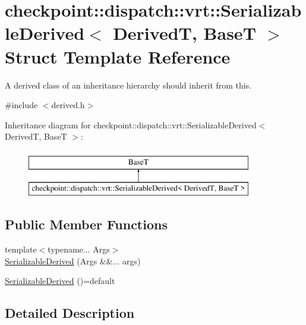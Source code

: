 \hypertarget{structcheckpoint_1_1dispatch_1_1vrt_1_1_serializable_derived}{}\section{checkpoint\+:\+:dispatch\+:\+:vrt\+:\+:Serializable\+Derived$<$ DerivedT, BaseT $>$ Struct Template Reference}
\label{structcheckpoint_1_1dispatch_1_1vrt_1_1_serializable_derived}


A derived class of an inheritance hierarchy should inherit from this.  




{\ttfamily \#include $<$derived.\+h$>$}

Inheritance diagram for checkpoint\+:\+:dispatch\+:\+:vrt\+:\+:Serializable\+Derived$<$ DerivedT, BaseT $>$\+:\begin{figure}[H]
\begin{center}
\leavevmode
\includegraphics[height=2.000000cm]{structcheckpoint_1_1dispatch_1_1vrt_1_1_serializable_derived}
\end{center}
\end{figure}
\subsection*{Public Member Functions}
\begin{DoxyCompactItemize}
\item 
{\footnotesize template$<$typename... Args$>$ }\\\hyperlink{structcheckpoint_1_1dispatch_1_1vrt_1_1_serializable_derived_ac9c3d3e0146ad0b29300c0849b127f1f}{Serializable\+Derived} (Args \&\&... args)
\item 
\hyperlink{structcheckpoint_1_1dispatch_1_1vrt_1_1_serializable_derived_a126a4835f6c6d1ba25afe7647959e3b6}{Serializable\+Derived} ()=default
\end{DoxyCompactItemize}


\subsection{Detailed Description}
